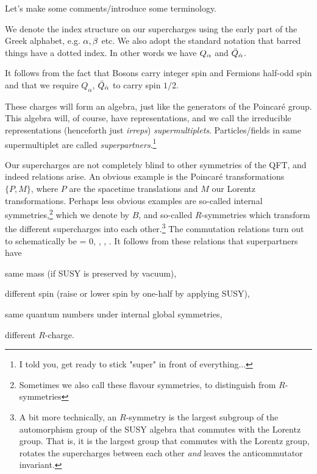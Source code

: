 Let's make some comments/introduce some terminology. 
\ben[label=(\roman*)]
    \item We denote the index structure on our supercharges using the early part of the Greek alphabet, e.g. $\alpha,\beta$ etc. We also adopt the standard notation that barred things have a dotted index. In other words we have $Q_{\alpha}$ and $\bar{Q}_{\dot{\alpha}}$. 
    \item It follows from the fact that Bosons carry integer spin and Fermions half-odd spin and  that we require $Q_\alpha$, $\bar{Q}_{\dot{\alpha}}$ to carry spin $1/2$.
    \item These charges will form an algebra, just like the generators of the Poincar\'{e} group. This algebra will, of course, have representations, and we call the irreducible representations (henceforth just \textit{irreps}) \textit{supermultiplets}. Particles/fields in same supermultiplet are called \emph{superpartners}.\footnote{I told you, get ready to stick "super" in front of everything...}
    \item Our supercharges are not completely blind to other symmetries of the QFT, and indeed relations arise. An obvious example is the Poincar\'{e} transformations $\{P, M\}$, where $P$ are the spacetime translations and $M$ our Lorentz transformations. Perhaps less obvious examples are so-called internal symmetries,\footnote{Sometimes we also call these flavour symmetries, to distinguish from $R$-symmetries} which we denote by $B$, and so-called $R$-symmetries which transform the different supercharges into each other.\footnote{A bit more technically, an $R$-symmetry is the largest subgroup of the automorphism group of the SUSY algebra that commutes with the Lorentz group. That is, it is the largest group that commutes with the Lorentz group, rotates the supercharges between each other \textit{and} leaves the anticommutator  invariant.} The commutation relations turn out to schematically be 
    \bse 
    [P,\widetilde{Q}] = 0, \qquad [M, \widetilde{Q}] \propto {}, , \qand [R,\widetilde{Q}]\propto {}.
    \ese 
    It follows from these relations that superpartners have
    \ben
         \item same mass (if SUSY is preserved by vacuum),
         \item different spin (raise or lower spin by one-half by applying SUSY),
         \item same quantum numbers under internal global symmetries,
         \item different $R$-charge.
